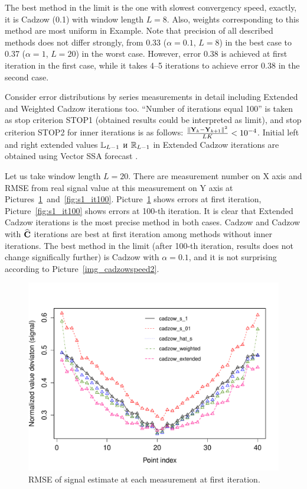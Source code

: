 \documentclass[12pt,a4paper,fleqn,leqno]{article}
\begin{document}
The best method in the limit is the one with slowest convergency speed, exactly, it is Cadzow (0.1) with window length $L=8$. Also, weights corresponding to this method are most uniform in Example.
Note that precision of all described methods does not differ strongly, from 0.33 ($\alpha=0.1$, $L=8$) in the best case to 0.37 ($\alpha=1$, $L=20$) in the worst case. However, error 0.38 is achieved at first iteration in the first case, while it takes 4--5 iterations to achieve error 0.38 in the second case.

Consider error distributions by series measurements in detail including Extended and Weighted Cadzow iterations too. ``Number of iterations equal 100'' is taken as stop criterion STOP1 (obtained results could be interpreted as limit), and stop criterion STOP2 for inner iterations is as follows:
 $\frac{\|\mathbf{Y}_k - \mathbf{Y}_{k+1}\|^2}{LK} < 10^{-4}$. Initial left and right extended values $\mathbb{L}_{L-1}$ и $\mathbb{R}_{L-1}$ in Extended Cadzow iterations are obtained using Vector SSA forecast \cite[chapter 2.3.1]{Golyandina.etal2001}.

Let us take window length $L=20$. There are measurement number on X axis and RMSE from real signal value at this measurement on Y axis at Pictures~\ref{fig:s1_it1}~and~\ref{fig:s1_it100}. Picture~\ref{fig:s1_it1} shows errors at first iteration, Picture~\ref{fig:s1_it100} shows errors at 100-th iteration. It is clear that Extended Cadzow iterations is the most precise method in both cases. Cadzow and Cadzow with $\widehat{\mathbf{C}}$ iterations are best at first iteration among methods without inner iterations. The best method in the limit (after 100-th iteration, results does not change significally further) is Cadzow with $\alpha=0.1$, and it is not surprising according to Picture~\ref{img_cadzowspeed2}.

\begin{figure}[!hhh]
\begin{center}
\includegraphics[width = 13cm]{s1_it1.pdf}
\caption{RMSE of signal estimate at each measurement at first iteration.}
\label{fig:s1_it1}
\end{center}
\end{figure}
\end{document}
